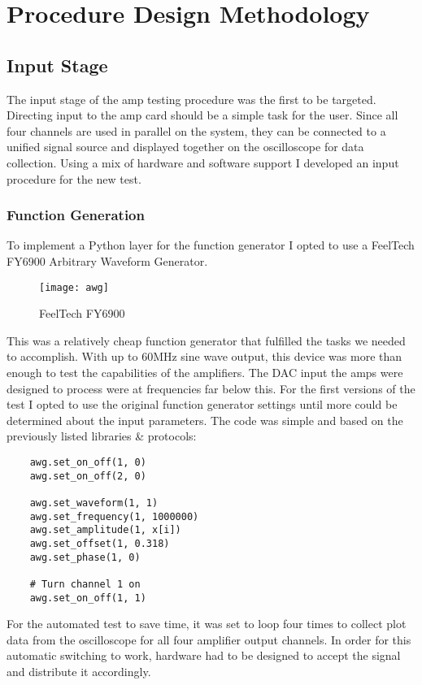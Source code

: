 \chapter{Procedure Design Methodology}
\section{Input Stage}
The input stage of the amp testing procedure was the first to be targeted. Directing input to the amp card should be a simple task for the user. Since all four channels are used in parallel on the system, they can be connected to a unified signal source and displayed together on the oscilloscope for data collection. Using a mix of hardware and software support I developed an input procedure for the new test.
\subsection{Function Generation}
To implement a Python layer for the function generator I opted to use a FeelTech FY6900 Arbitrary Waveform Generator.
\begin{figure}[!htb]
	\centering
	\texttt{[image: awg]}
	\caption{FeelTech FY6900}
\end{figure}
This was a relatively cheap function generator that fulfilled the tasks we needed to accomplish. With up to 60MHz sine wave output, this device was more than enough to test the capabilities of the amplifiers. The DAC input the amps were designed to process were at frequencies far below this. For the first versions of the test I opted to use the original function generator settings until more could be determined about the input parameters. The code was simple and based on the previously listed libraries \& protocols:
\begin{lstlisting}
	awg.set_on_off(1, 0)
	awg.set_on_off(2, 0)

	awg.set_waveform(1, 1)
	awg.set_frequency(1, 1000000)
	awg.set_amplitude(1, x[i])
	awg.set_offset(1, 0.318)
	awg.set_phase(1, 0)

	# Turn channel 1 on
	awg.set_on_off(1, 1)
\end{lstlisting}
For the automated test to save time, it was set to loop four times to collect plot data from the oscilloscope for all four amplifier output channels. In order for this automatic switching to work, hardware had to be designed to accept the signal and distribute it accordingly.
